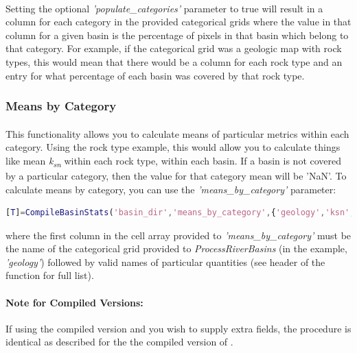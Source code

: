 \paragraph{}Setting the optional \textit{'populate\_categories'} parameter to true will result in a column for each category in the provided categorical grids where the value in that column for a given basin is the percentage of pixels in that basin which belong to that category. For example, if the categorical grid was a geologic map with rock types, this would mean that there would be a column for each rock type and an entry for what percentage of each basin was covered by that rock type.

\subsubsection{Means by Category}
\paragraph{}This functionality allows you to calculate means of particular metrics within each category. Using the rock type example, this would allow you to calculate things like mean \textit{k\textsubscript{sn}} within each rock type, within each basin. If a basin is not covered by a particular category, then the value for that category mean will be 'NaN'. To calculate means by category, you can use the \textit{'means\_by\_category'} parameter:

\begin{lstlisting}[language=Matlab]
% To calculate means using the geology additional grid for ksn and 2500 m local relief
[T]=CompileBasinStats('basin_dir','means_by_category',{'geology','ksn','rlf2500'});
\end{lstlisting}

\noindent
where the first column in the cell array provided to \textit{'means\_by\_category'} must be the name of the categorical grid provided to \textit{ProcessRiverBasins} (in the example, \textit{'geology'}) followed by valid names of particular quantities (see header of the function for full list).

\paragraph{Note for Compiled Versions:} If using the compiled version  and you wish to supply extra fields, the procedure is identical as described for the the compiled version of .

